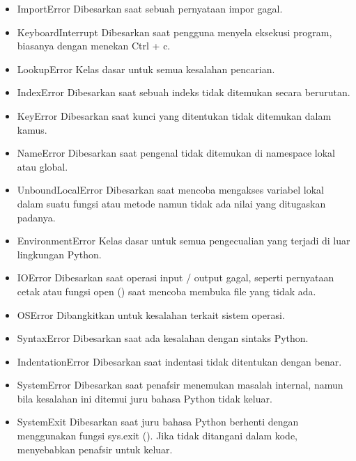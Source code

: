 \begin{enumerate}
\begin{itemize}
        \item ImportError
        Dibesarkan saat sebuah pernyataan impor gagal.

        \item KeyboardInterrupt
        Dibesarkan saat pengguna menyela eksekusi program, biasanya dengan menekan Ctrl + c.

        \item LookupError
        Kelas dasar untuk semua kesalahan pencarian.

        \item IndexError
        Dibesarkan saat sebuah indeks tidak ditemukan secara berurutan.

        \item KeyError
        Dibesarkan saat kunci yang ditentukan tidak ditemukan dalam kamus.

        \item NameError
        Dibesarkan saat pengenal tidak ditemukan di namespace lokal atau global.

        \item UnboundLocalError
        Dibesarkan saat mencoba mengakses variabel lokal dalam suatu fungsi atau metode namun tidak ada nilai yang ditugaskan padanya.

        \item EnvironmentError
        Kelas dasar untuk semua pengecualian yang terjadi di luar lingkungan Python.

        \item IOError
        Dibesarkan saat operasi input / output gagal, seperti pernyataan cetak atau fungsi open () saat mencoba membuka file yang tidak ada.

        \item OSError
        Dibangkitkan untuk kesalahan terkait sistem operasi.

        \item SyntaxError
        Dibesarkan saat ada kesalahan dengan sintaks Python.

        \item IndentationError
        Dibesarkan saat indentasi tidak ditentukan dengan benar.

        \item SystemError
        Dibesarkan saat penafsir menemukan masalah internal, namun bila kesalahan ini ditemui juru bahasa Python tidak keluar.

        \item SystemExit
        Dibesarkan saat juru bahasa Python berhenti dengan menggunakan fungsi sys.exit (). Jika tidak ditangani dalam kode, menyebabkan penafsir untuk keluar.


\end{itemize}
\end{enumerate}
